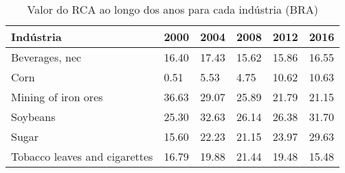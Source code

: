 \begin{table}
\centering
\caption{Valor do RCA ao longo dos anos para cada indústria (BRA)}
\label{tab:ex3-tempo-BRA}
\begin{tabular}{p{6cm}p{1.5cm}p{1.5cm}p{1.5cm}p{1.5cm}p{1.5cm}}
\toprule
                    Indústria &  2000 &  2004 &  2008 &  2012 &  2016 \\
\midrule
               Beverages, nec & 16.40 & 17.43 & 15.62 & 15.86 & 16.55 \\
                         Corn &  0.51 &  5.53 &  4.75 & 10.62 & 10.63 \\
          Mining of iron ores & 36.63 & 29.07 & 25.89 & 21.79 & 21.15 \\
                     Soybeans & 25.30 & 32.63 & 26.14 & 26.38 & 31.70 \\
                        Sugar & 15.60 & 22.23 & 21.15 & 23.97 & 29.63 \\
Tobacco leaves and cigarettes & 16.79 & 19.88 & 21.44 & 19.48 & 15.48 \\
\bottomrule
\end{tabular}
\end{table}
